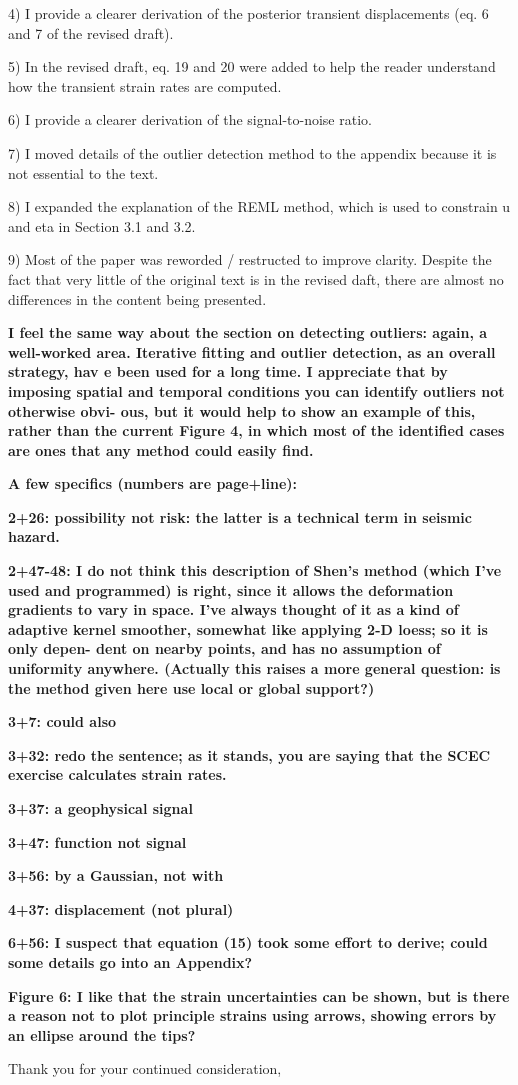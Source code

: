 \documentclass[10pt,a4paper]{letter}
\begin{document}
\begin{letter}{}
  4) I provide a clearer derivation of the posterior transient
     displacements (eq. 6 and 7 of the revised draft). 
  
  5) In the revised draft, eq. 19 and 20 were added to help the reader
     understand how the transient strain rates are computed.

  6) I provide a clearer derivation of the signal-to-noise ratio.
  
  7) I moved details of the outlier detection method to the appendix
     because it is not essential to the text.

  8) I expanded the explanation of the REML method, which is used to
     constrain u and eta in Section 3.1 and 3.2.

  9) Most of the paper was reworded / restructed to improve
     clarity. Despite the fact that very little of the original text
     is in the revised daft, there are almost no differences in the
     content being presented.
 

\textbf{I feel the same way about the section on detecting outliers: again, a
well-worked area. Iterative fitting and outlier detection, as an
overall strategy, hav e been used for a long time. I appreciate that
by imposing spatial and temporal conditions you can identify outliers
not otherwise obvi- ous, but it would help to show an example of this,
rather than the current Figure 4, in which most of the identified
cases are ones that any method could easily find.}



\textbf{A few specifics (numbers are page+line):}

\textbf{2+26: possibility not risk: the latter is a technical term in seismic
hazard.}

\textbf{2+47-48: I do not think this description of Shen’s method (which I’ve
used and programmed) is right, since it allows the deformation
gradients to vary in space. I’ve always thought of it as a kind of
adaptive kernel smoother, somewhat like applying 2-D loess; so it is
only depen- dent on nearby points, and has no assumption of uniformity
anywhere. (Actually this raises a more general question: is the method
given here use local or global support?)}

\textbf{3+7: could also}

\textbf{3+32: redo the sentence; as it stands, you are saying that the SCEC
exercise calculates strain rates.}

\textbf{3+37: a geophysical signal}

\textbf{3+47: function not signal}

\textbf{3+56: by a Gaussian, not with}

\textbf{4+37: displacement (not plural)}

\textbf{6+56: I suspect that equation (15) took some effort to derive; could
some details go into an Appendix?}

\textbf{Figure 6: I like that the strain uncertainties can be shown, but is
there a reason not to plot principle strains using arrows, showing
errors by an ellipse around the tips?}

\closing{Thank you for your continued consideration,}

\end{letter}
\end{document}
